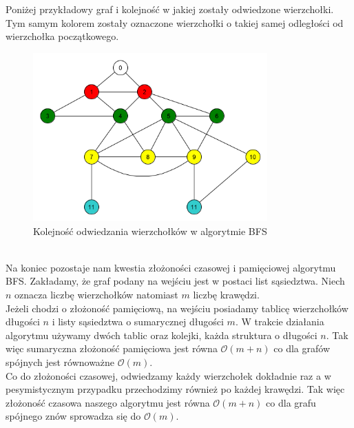 \documentclass[12pt,a4paper,titlepage]{article}
\newcommand\tab[1][1cm]{\hspace*{#1}}
\begin{document}
Poniżej przykładowy graf i kolejność w jakiej zostały odwiedzone wierzchołki. Tym samym kolorem zostały oznaczone wierzchołki o takiej samej odległości od wierzchołka początkowego.
\begin{figure}[h]
\centering
\includegraphics[width = 9cm]{bfs.png}
\caption{Kolejność odwiedzania wierzchołków w algorytmie BFS}
\end{figure}
\\
\tab[0.6cm]Na koniec pozostaje nam kwestia złożoności czasowej i pamięciowej algorytmu BFS. Zakładamy, że graf podany na wejściu jest w postaci list sąsiedztwa. Niech $n$ oznacza liczbę wierzchołków natomiast $m$ liczbę krawędzi.\\
\tab[0.6cm]Jeżeli chodzi o złożoność pamięciową, na wejściu posiadamy tablicę wierzchołków długości $n$ i listy sąsiedztwa o sumarycznej długości $m$. W trakcie działania algorytmu używamy dwóch tablic oraz kolejki, każda struktura o długości $n$. Tak więc sumaryczna złożoność pamięciowa jest równa $\mathcal{O}(m+n)$ co dla grafów spójnych jest równoważne $\mathcal{O}(m)$.\\
\tab[0.6cm]Co do złożoności czasowej, odwiedzamy każdy wierzchołek dokładnie raz a w pesymistycznym przypadku przechodzimy również po każdej krawędzi. Tak więc złożoność czasowa naszego algorytmu jest równa $\mathcal{O}(m+n)$ co dla grafu spójnego znów sprowadza się do $\mathcal{O}(m)$.
\end{document}

